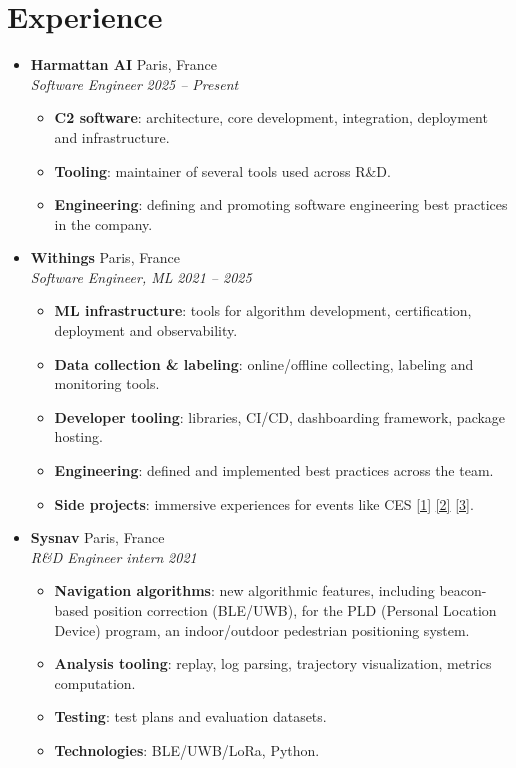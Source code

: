 \documentclass[a4paper,11pt]{article}
\newcommand{\entry}[4]{%
\item \textbf{#1} \hfill #2 \\
\textit{\small #3} \hfill \textit{\small #4}}
\newenvironment{entries}{
\begin{itemize}[leftmargin=1.2em, itemsep=4pt, parsep=0pt, topsep=0pt]}{
\end{itemize}}
\newenvironment{details}{
\begin{itemize}[label=$\circ$, leftmargin=1.5em, itemsep=0pt, parsep=0pt, topsep=2pt]\small}{
\end{itemize}}
\begin{document}
\section{Experience}
\begin{entries}
  \entry{Harmattan AI}{Paris, France}{Software Engineer}{2025 -- Present}
  \begin{details}
  \item \textbf{C2 software}: architecture, core development, integration, deployment and
    infrastructure.
  \item \textbf{Tooling}: maintainer of several tools used across R\&D.
  \item \textbf{Engineering}: defining and promoting software engineering best practices
    in the company.
  \end{details}

  \entry{Withings}{Paris, France}{Software Engineer, ML}{2021 -- 2025}
  \begin{details}
  \item \textbf{ML infrastructure}: tools for algorithm development, certification,
    deployment and observability.
  \item \textbf{Data collection \& labeling}: online/offline collecting, labeling and
    monitoring tools.
  \item \textbf{Developer tooling}: libraries, CI/CD, dashboarding framework, package hosting.
  \item \textbf{Engineering}: defined and implemented best practices across the team.
  \item \textbf{Side projects}: immersive experiences for events like CES
    {\footnotesize\href{https://www.athem.fr/en/projects/l-art-de-vivre-mieux-withings}{[1]}
    \href{https://www.instagram.com/p/C17NvkmIJ_H}{[2]}
    \href{https://vimeo.com/1109710406}{[3]}}.
  \end{details}

  \entry{Sysnav}{Paris, France}{R\&D Engineer intern}{2021}
  \begin{details}
  \item \textbf{Navigation algorithms}: new algorithmic features, including beacon-based position
    correction (BLE/UWB), for the PLD (Personal Location Device) program, an indoor/outdoor
    pedestrian positioning system.
  \item \textbf{Analysis tooling}: replay, log parsing, trajectory visualization, metrics
    computation.
  \item \textbf{Testing}: test plans and evaluation datasets.
  \item \textbf{Technologies}: BLE/UWB/LoRa, Python.
  \end{details}


\end{entries}
\end{document}
